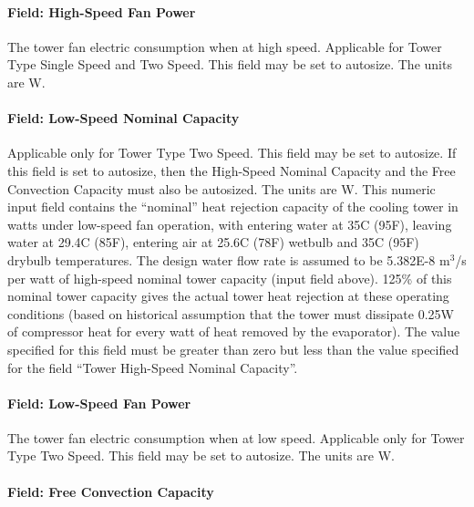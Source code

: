 \paragraph{Field: High-Speed Fan Power}\label{field-high-speed-fan-power}

The tower fan electric consumption when at high speed. Applicable for Tower Type Single Speed and Two Speed. This field may be set to autosize. The units are W.

\paragraph{Field: Low-Speed Nominal Capacity}\label{field-low-speed-nominal-capacity-000}

Applicable only for Tower Type Two Speed. This field may be set to autosize. If this field is set to autosize, then the High-Speed Nominal Capacity and the Free Convection Capacity must also be autosized. The units are W. This numeric input field contains the ``nominal'' heat rejection capacity of the cooling tower in watts under low-speed fan operation, with entering water at 35C (95F), leaving water at 29.4C (85F), entering air at 25.6C (78F) wetbulb and 35C (95F) drybulb temperatures. The design water flow rate is assumed to be 5.382E-8 m\(^{3}\)/s per watt of high-speed nominal tower capacity (input field above). 125\% of this nominal tower capacity gives the actual tower heat rejection at these operating conditions (based on historical assumption that the tower must dissipate 0.25W of compressor heat for every watt of heat removed by the evaporator). The value specified for this field must be greater than zero but less than the value specified for the field ``Tower High-Speed Nominal Capacity''.

\paragraph{Field: Low-Speed Fan Power}\label{field-low-speed-fan-power}

The tower fan electric consumption when at low speed. Applicable only for Tower Type Two Speed. This field may be set to autosize. The units are W.

\paragraph{Field: Free Convection Capacity}\label{field-free-convection-capacity-000}

